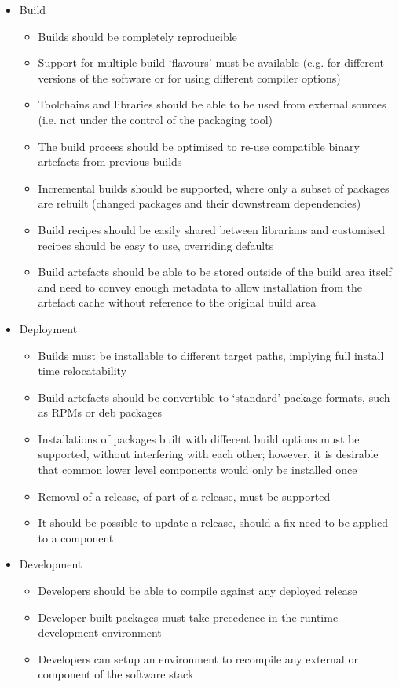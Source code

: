 \documentclass{webofc}
\begin{document}
\begin{itemize}
    \item Build
    \begin{itemize}
        \item Builds should be completely reproducible
        \item Support for multiple build `flavours' must be available
            (e.g. for different versions of the software or for 
            using different compiler options)
        \item Toolchains and libraries should be able to be used from
            external sources (i.e. not under the control of the packaging tool)
        \item The build process should be optimised to re-use compatible
            binary artefacts from previous builds
        \item Incremental builds should be supported, where only a subset
            of packages are rebuilt (changed packages and their downstream
            dependencies)
        \item Build recipes should be easily shared between librarians
            and customised recipes should be easy to use, overriding defaults
        \item Build artefacts should be able to be stored outside of the
            build area itself and need to convey enough metadata to allow
            installation from the artefact cache without reference to the
            original build area
    \end{itemize}
    \item Deployment
    \begin{itemize}
        \item Builds must be installable to different target paths, implying
            full install time relocatability
        \item Build artefacts should be convertible to `standard' package
            formats, such as RPMs or deb packages
        \item Installations of packages built with different build options
            must be supported, without interfering with each other; however,
            it is desirable that common lower level components would only
            be installed once
        \item Removal of a release, of part of a release, must be supported
        \item It should be possible to update a release, should a fix need to
            be applied to a component
    \end{itemize}
    \item Development
    \begin{itemize}
        \item Developers should be able to compile against any deployed release
        \item Developer-built packages must take precedence in the runtime
            development environment
        \item Developers can setup an environment to recompile any external
            or component of the software stack
    \end{itemize}
\end{itemize}
\end{document}
